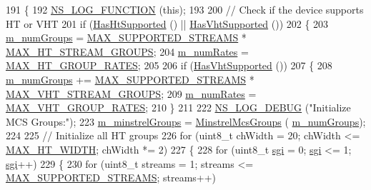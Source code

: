 \begin{DoxyCode}
191 \{
192   \hyperlink{log-macros-disabled_8h_a90b90d5bad1f39cb1b64923ea94c0761}{NS\_LOG\_FUNCTION} (\textcolor{keyword}{this});
193 
200   \textcolor{comment}{// Check if the device supports HT or VHT}
201   \textcolor{keywordflow}{if} (\hyperlink{classns3_1_1WifiRemoteStationManager_ac792dc8f3c77d507d25de0b87b52608c}{HasHtSupported} () || \hyperlink{classns3_1_1WifiRemoteStationManager_afae2836c7785854272d73bf33e58c95a}{HasVhtSupported} ())
202     \{
203       \hyperlink{classns3_1_1MinstrelHtWifiManager_a8a0964148ee665bab466b2858e8094b7}{m\_numGroups} = \hyperlink{namespacens3_ae11d9ba4764a3d93a0e9a15c40c94db1}{MAX\_SUPPORTED\_STREAMS} * 
      \hyperlink{namespacens3_a90ea346dc88400cf34c4379808fd35ba}{MAX\_HT\_STREAM\_GROUPS};
204       \hyperlink{classns3_1_1MinstrelHtWifiManager_a2f3d0e7f6c298a40dbc8699805103142}{m\_numRates} = \hyperlink{namespacens3_a09e2444bef75884650d2d5a53b6cd489}{MAX\_HT\_GROUP\_RATES};
205 
206       \textcolor{keywordflow}{if} (\hyperlink{classns3_1_1WifiRemoteStationManager_afae2836c7785854272d73bf33e58c95a}{HasVhtSupported} ())
207         \{
208           \hyperlink{classns3_1_1MinstrelHtWifiManager_a8a0964148ee665bab466b2858e8094b7}{m\_numGroups} += \hyperlink{namespacens3_ae11d9ba4764a3d93a0e9a15c40c94db1}{MAX\_SUPPORTED\_STREAMS} * 
      \hyperlink{namespacens3_a10ef82db566ad2572e2374fd1cbbfa75}{MAX\_VHT\_STREAM\_GROUPS};
209           \hyperlink{classns3_1_1MinstrelHtWifiManager_a2f3d0e7f6c298a40dbc8699805103142}{m\_numRates} = \hyperlink{namespacens3_a55aceb8d2eb4d90f4501847187fbe2a6}{MAX\_VHT\_GROUP\_RATES};
210         \}
211 
222       \hyperlink{group__logging_ga413f1886406d49f59a6a0a89b77b4d0a}{NS\_LOG\_DEBUG} (\textcolor{stringliteral}{"Initialize MCS Groups:"});
223       \hyperlink{classns3_1_1MinstrelHtWifiManager_a231741ce3f38417925019aa598570468}{m\_minstrelGroups} = \hyperlink{namespacens3_a246bc05fa23a9042a610b32301e0ae42}{MinstrelMcsGroups} (
      \hyperlink{classns3_1_1MinstrelHtWifiManager_a8a0964148ee665bab466b2858e8094b7}{m\_numGroups});
224 
225       \textcolor{comment}{// Initialize all HT groups}
226       \textcolor{keywordflow}{for} (uint8\_t chWidth = 20; chWidth <= \hyperlink{namespacens3_a8458cf81b47edd1b0c4dc3f67f71732d}{MAX\_HT\_WIDTH}; chWidth *= 2)
227         \{
228           \textcolor{keywordflow}{for} (uint8\_t \hyperlink{namespacestd}{sgi} = 0; \hyperlink{namespacestd}{sgi} <= 1; \hyperlink{namespacestd}{sgi}++)
229             \{
230               \textcolor{keywordflow}{for} (uint8\_t streams = 1; streams <= \hyperlink{namespacens3_ae11d9ba4764a3d93a0e9a15c40c94db1}{MAX\_SUPPORTED\_STREAMS}; streams++)

\end{DoxyCode}

